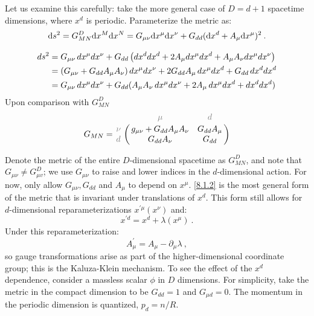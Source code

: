 Let us examine this carefully: take the more general case of $D=d+1$ spacetime dimensions, where $x^{d}$ is periodic.
Parameterize the metric as:
\begin{equation}
	\mathrm{d} s^{2}=G_{M N}^{D} \mathrm{d} x^{M} \mathrm{d} x^{N}=G_{\mu \nu} \mathrm{d} x^{\mu} \mathrm{d} x^{\nu}+G_{d d}(\mathrm{d} x^{d}+A_{\mu} \mathrm{d} x^{\mu})^{2} \:. \label{8.1.2}
\end{equation}
\begin{tcolorbox}[breakable]
	\begin{remark}
		\begin{align*}
			ds^2 &= G_{\mu\nu} \, dx^\mu dx^\nu + G_{dd} \left( dx^d dx^d + 2A_\mu dx^\mu dx^d + A_\mu A_\nu dx^\mu dx^\nu \right)\notag\\
			&= (G_{\mu\nu} + G_{dd} A_\mu A_\nu) \, dx^\mu dx^\nu + 2 G_{dd} A_\mu \, dx^\mu dx^d + G_{dd} \, dx^d dx^d\\
			&=G_{\mu\nu} \, dx^\mu dx^\nu + G_{dd} (A_\mu A_\nu\, dx^\mu dx^\nu+ 2 A_\mu \, dx^\mu dx^d + dx^d dx^d)
		\end{align*}
		Upon comparison with $G_{MN}^D$
		\vspace*{-20pt}
		\begin{equation*}
			G_{MN} = 
			\bordermatrix{
				& {\color{gray}\mu} & {\color{gray}d} \cr
				{\color{gray}\nu} & g_{\mu\nu} + G_{dd} A_\mu A_\nu & G_{dd} A_\mu \cr
				{\color{gray}d} & G_{dd} A_\nu & G_{dd} \cr
			}
		\end{equation*}
	\end{remark}
\end{tcolorbox}
Denote the metric of the entire $D$-dimensional spacetime as $G_{M N}^{D} $, and note that $G_{\mu \nu} \neq G_{\mu v}^{D} $; we use $G_{\mu \nu} $ to raise and lower indices in the $d$-dimensional action.
For now, only allow $G_{\mu \nu}, G_{d d}$ and $A_{\mu}$ to depend on $x^{\mu}$. \eqref{8.1.2} is the most general form of the metric that is invariant under translations of $x^{d}$. 
This form still allows for $d$-dimensional reparameterizations $x^{\prime \mu}(x^{\nu})$ and:
\begin{equation}
	x^{\prime d}=x^{d}+\lambda(x^{\mu}) \:. \label{8.1.3}
\end{equation}
Under this reparameterization:
\begin{equation}
	A_{\mu}^{\prime}=A_{\mu}-\partial_{\mu} \lambda \:, \label{8.1.4}
\end{equation}
so gauge transformations arise as part of the higher-dimensional coordinate group; this is the Kaluza-Klein mechanism. To see the effect of the $x^{d}$ dependence, consider a massless scalar $\phi$ in $D$ dimensions. For simplicity, take the metric in the compact dimension to be $G_{d d}=1$ and $G_{\mu d}=0$. The momentum in the periodic dimension is quantized, $p_{d}=n / R$.
